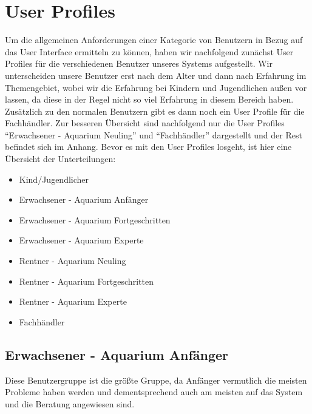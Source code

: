 \chapter{User Profiles}

Um die allgemeinen Anforderungen einer Kategorie von Benutzern in Bezug auf das User Interface ermitteln zu können, haben wir nachfolgend zunächst User Profiles für die verschiedenen Benutzer unseres Systems aufgestellt. Wir unterscheiden unsere Benutzer erst nach dem Alter und dann nach Erfahrung im Themengebiet, wobei wir die Erfahrung bei Kindern und Jugendlichen außen vor lassen, da diese in der Regel nicht so viel Erfahrung in diesem Bereich haben. Zusätzlich zu den normalen Benutzern gibt es dann noch ein User Profile für die Fachhändler. Zur besseren Übersicht sind nachfolgend nur die User Profiles ``Erwachsener - Aquarium Neuling'' und ``Fachhändler'' dargestellt und der Rest befindet sich im Anhang. Bevor es mit den User Profiles losgeht, ist hier eine Übersicht der Unterteilungen:

\begin{itemize}
\item Kind/Jugendlicher
\item Erwachsener - Aquarium Anfänger
\item Erwachsener - Aquarium Fortgeschritten
\item Erwachsener - Aquarium Experte
\item Rentner - Aquarium Neuling
\item Rentner - Aquarium Fortgeschritten
\item Rentner - Aquarium Experte
\item Fachhändler
\end{itemize}

\renewcommand{\title}{Erwachsener - Aquarium Anfänger}
\section{\title}

Diese Benutzergruppe ist die größte Gruppe, da Anfänger vermutlich die meisten Probleme haben werden und dementsprechend auch am meisten auf das System und die Beratung angewiesen sind. 

